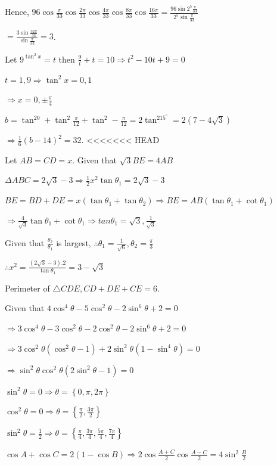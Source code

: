   Hence, $96\cos\frac{\pi}{33}\cos\frac{2\pi}{33}\cos\frac{4\pi}{33}\cos\frac{8\pi}{33}\cos\frac{16\pi}{33}
  = \frac{96\sin2^5\frac{\pi}{33}}{2^5\sin\frac{\pi}{33}}$

  $= \frac{3\sin\frac{32\pi}{33}}{\sin\frac{\pi}{33}} = 3$.
\item Let $9^{\tan^2x} = t$ then $\frac{9}{t} + t = 10\Rightarrow t^2 - 10t + 9 = 0$

  $t = 1, 9\Rightarrow \tan^2x = 0, 1$

  $\Rightarrow x = 0, \pm\frac{\pi}{4}$

  $b = \tan^20 + \tan^2\frac{\pi}{12} + \tan^2-\frac{\pi}{12} = 2\tan^215^\circ = 2\left(7 -
  4\sqrt{3}\right)$

  $\Rightarrow \frac{1}{6}(b - 14)^2 = 32$.
<<<<<<< HEAD
\item Let $AB = CD = x$. Given that $\sqrt{3}BE = 4AB$

  $\Delta ABC = 2\sqrt{3} - 3 \Rightarrow \frac{1}{2}x^2\tan\theta_1 = 2\sqrt{3} - 3$

  $BE = BD + DE = x(\tan\theta_1 + \tan\theta_2)\Rightarrow BE = AB(\tan\theta_1 + \cot\theta_1)$

  $\Rightarrow \frac{4}{\sqrt{3}}\tan\theta_1 + \cot\theta_1 \Rightarrow tan\theta_1
  = \sqrt{3}, \frac{1}{\sqrt{3}}$

  Given that $\frac{\theta_2}{\theta_1}$ is largest, $\therefore \theta_1 = \frac{1}{\sqrt{6}}, \theta_2
  = \frac{\pi}{3}$

  $\therefore x^2 = \frac{\left(2\sqrt{3} - 3\right).2}{\tan\theta_1} = 3 - \sqrt{3}$

  Perimeter of $\triangle CDE, CD + DE + CE = 6$.
\item Given that $4\cos^4\theta - 5\cos^{2}\theta - 2\sin^6\theta + 2 = 0$

  $\Rightarrow 3\cos^4\theta - 3\cos^2\theta - 2\cos^2\theta - 2\sin^6\theta + 2 = 0$

  $\Rightarrow 3\cos^2\theta\left(\cos^2\theta - 1\right) + 2\sin^2\theta\left(1 - \sin^4\theta\right) = 0$

  $\Rightarrow \sin^2\theta\cos^2\theta\left(2\sin^2\theta - 1\right) = 0$

  $\sin^2\theta = 0 \Rightarrow \theta = \left\{0, \pi, 2\pi\right\}$

  $\cos^2\theta = 0 \Rightarrow \theta = \left\{\frac{\pi}{2}, \frac{3\pi}{2}\right\}$

  $\sin^2\theta = \frac{1}{2} \Rightarrow \theta
  = \left\{\frac{\pi}{4}, \frac{3\pi}{4}, \frac{5\pi}{4}, \frac{7\pi}{4}\right\}$
\item $\cos A + \cos C = 2(1 - \cos B) \Rightarrow 2\cos\frac{A + C}{2}\cos\frac{A - C}{2} =
  4\sin^2\frac{B}{2}$

